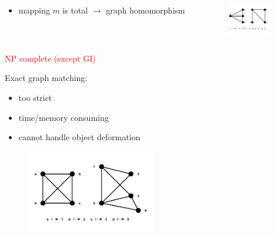 \documentclass[hyperref={pdfpagelabels=false}]{beamer}
\begin{document}
\begin{frame}[allowframebreaks]
\begin{minipage}[0.2\textheight]{\textwidth}
	\begin{columns}[T]
		\begin{column}{0.6\textwidth}
			\begin{itemize}
			\item mapping $m$ is total\hspace{15pt} $\rightarrow$ graph homomorphism
			\end{itemize}
		\end{column}
		\begin{column}{0.3\textwidth}
			\begin{figure}[h!]
			    \centering
			    \includegraphics[width=2cm]{fig/homomorphism}
			\end{figure}
		\end{column}
	\end{columns}
\end{minipage}
\textcolor{red}{NP complete (except GI)~\cite{Garey_NPComplet}}

\framebreak
Exact graph matching:
\begin{itemize}
\item too strict
\item time/memory consuming
\item cannot handle object deformation
\end{itemize}
\begin{figure}[htb]
	\centering
	\includegraphics[width=0.5\textwidth]{fig/inexactGM}
\end{figure}
\end{frame}

\end{document}
